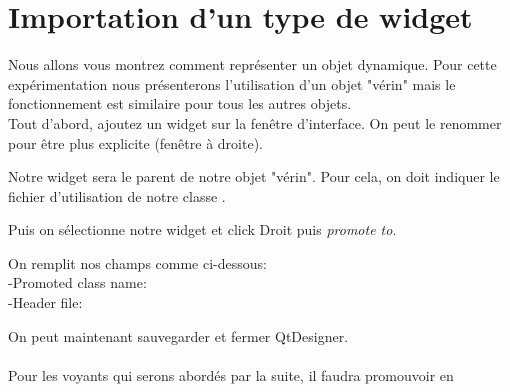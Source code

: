 \section{Importation d'un type de widget}

Nous allons vous montrez comment représenter un objet dynamique. Pour cette expérimentation nous présenterons l'utilisation d'un objet "vérin" mais le fonctionnement est similaire pour tous les autres objets.\\

Tout d'abord, ajoutez un widget sur la fenêtre d'interface.
On peut le renommer pour être plus explicite (fenêtre à droite).

Notre widget sera le parent de notre objet "vérin". Pour cela, on doit indiquer le fichier d'utilisation de notre classe .


Puis on sélectionne notre widget et click Droit puis \textit{promote to}. 


On remplit nos champs comme ci-dessous:\\
-Promoted class name: \\
-Header file: 


On peut maintenant sauvegarder et fermer QtDesigner. \\

 \\

Pour les voyants qui serons abordés par la suite, il faudra promouvoir en 

